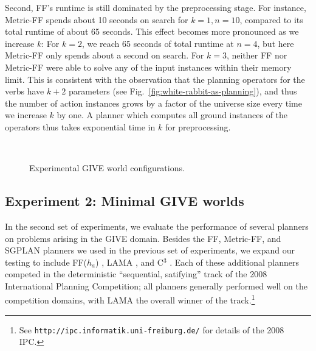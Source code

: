Second, FF's runtime is still dominated by the preprocessing
stage. For instance, Metric-FF spends about 10 seconds on search for
$k=1,n=10$, compared to its total runtime of about 65 seconds. This
effect becomes more pronounced as we increase $k$: For $k=2$, we reach
65 seconds of total runtime at $n=4$, but here Metric-FF only spends
about a second on search. For $k=3$, neither FF nor Metric-FF were
able to solve any of the input instances within their memory
limit. This is consistent with the observation that the planning
operators for the verbs have $k+2$ parameters (see
Fig.~\ref{fig:white-rabbit-as-planning}), and thus the number of
action instances grows by a factor of the universe size every time we
increase $k$ by one. A planner which computes all ground instances of
the operators thus takes exponential time in $k$ for preprocessing.

\begin{figure}[t]
  \centering
  \qquad
   \\
  \caption{Experimental GIVE world configurations.}
  \label{fig:give-maps}
\end{figure}


\subsection{Experiment 2: Minimal GIVE worlds}
\label{sec:exper-2:-minim}

In the second set of experiments, we evaluate the performance of
several planners on problems arising in the GIVE domain. Besides the
FF, Metric-FF, and SGPLAN planners we used in the previous set of
experiments, we expand our testing to include FF($h_a$)
\citep{keyder08:_ff_h_plann_for_plann}, LAMA
\citep{richter08:_lama_plann}, and C$^3$
\citep{lipovetzky08:_c3}. Each of these additional planners competed
in the deterministic ``sequential, satifying'' track of the 2008
International Planning Competition; all planners generally performed
well on the competition domains, with LAMA the overall winner of the
track.\footnote{See \texttt{http://ipc.informatik.uni-freiburg.de/}
  for details of the 2008 IPC.}

